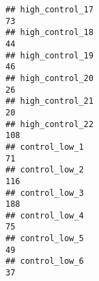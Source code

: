 \documentclass[
]{article}
\begin{document}
\begin{verbatim}
## high_control_17                                                                                                                                                                                                             73
## high_control_18                                                                                                                                                                                                             44
## high_control_19                                                                                                                                                                                                             46
## high_control_20                                                                                                                                                                                                             26
## high_control_21                                                                                                                                                                                                             20
## high_control_22                                                                                                                                                                                                            108
## control_low_1                                                                                                                                                                                                               71
## control_low_2                                                                                                                                                                                                              116
## control_low_3                                                                                                                                                                                                              188
## control_low_4                                                                                                                                                                                                               75
## control_low_5                                                                                                                                                                                                               49
## control_low_6                                                                                                                                                                                                               37

\end{verbatim}
\end{document}
